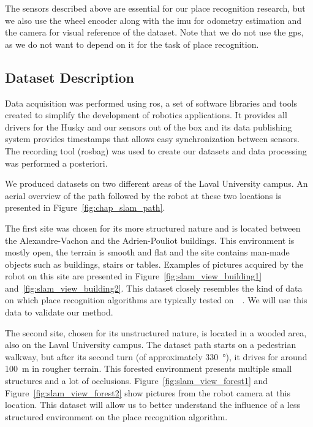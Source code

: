 The sensors described above are essential for our place recognition research, but we also use the wheel encoder along with the \gls*{imu} for odometry estimation and the camera for visual reference of the dataset. Note that we do not use the \gls*{gps}, as we do not want to depend on it for the task of place recognition.


\subsection{Dataset Description}
\label{ssec:chap_slam_platform}

Data acquisition was performed using \gls*{ros}, a set of software libraries and tools created to simplify the development of robotics applications. It provides all drivers for the Husky and our sensors out of the box and its data publishing system provides timestamps that allows easy synchronization between sensors. The recording tool (rosbag) was used to create our datasets and data processing was performed a posteriori.

We produced datasets on two different areas of the Laval University campus. An aerial overview of the path followed by the robot at these two locations is presented in Figure~\ref{fig:chap_slam_path}.

The first site was chosen for its more structured nature and is located between the Alexandre-Vachon and the Adrien-Pouliot buildings. This environment is mostly open, the terrain is smooth and flat and the site contains man-made objects such as buildings, stairs or tables. Examples of pictures acquired by the robot on this site are presented in Figure~\ref{fig:slam_view_building1} and~\ref{fig:slam_view_building2}. This dataset closely resembles the kind of data on which place recognition algorithms are typically tested on~\cite{FreiburgDataset}~\cite{Datasets}. We will use this data to validate our method.

The second site, chosen for its unstructured nature, is located in a wooded area, also on the Laval University campus. The dataset path starts on a pedestrian walkway, but after its second turn (of approximately \SI{330}{\degree}), it drives for around \SI{100}{\meter} in rougher terrain. This forested environment presents multiple small structures and a lot of occlusions. Figure~\ref{fig:slam_view_forest1} and Figure~\ref{fig:slam_view_forest2} show pictures from the robot camera at this location. This dataset will allow us to better understand the influence of a less structured environment on the place recognition algorithm.

